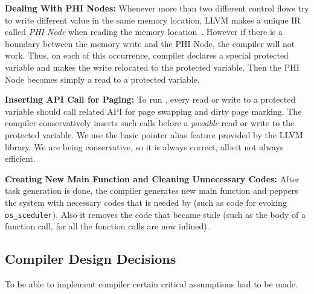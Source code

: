 \textbf{Dealing With PHI Nodes:} Whenever more than two different control flows try to write different value in the same memory location, LLVM makes a unique IR called {\em PHI Node} when reading the memory location~\cite{}. However if there is a boundary between the memory write and the PHI Node, the compiler will not work. Thus, on each of this occurrence, \sys compiler declares a special protected variable and makes the write relocated to the protected variable. Then the PHI Node becomes simply a read to a protected variable.

\textbf{Inserting API Call for Paging:} To run \sys, every read or write to a protected variable should call related API for page swapping and dirty page marking. The compiler conservatively inserts such calls before a {\em possible} read or write to the protected variable. We use the basic pointer alias feature provided by the LLVM library. We are being conservative, so it is always correct, albeit not always efficient.

\textbf{Creating New Main Function and Cleaning Unnecessary Codes:} After task generation is done, the compiler generates new main function and peppers the system with necessary codes that is needed by \sys (such as code for evoking {\tt os\_sceduler}). Also it removes the code that became stale (such as the body of a function call, for all the function calls are now inlined).

\subsection{Compiler Design Decisions}
\label{sec:compiler_limitations}

To be able to implement \sys compiler certain critical assumptions had to be made. 

